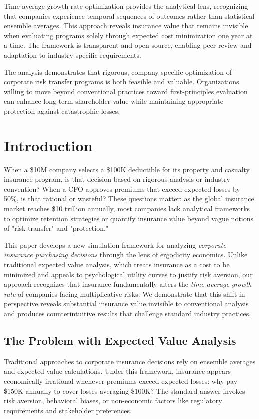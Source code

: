 \documentclass[11pt,letterpaper]{article}
\begin{document}
Time-average growth rate optimization provides the analytical lens, recognizing that companies experience temporal sequences of outcomes rather than statistical ensemble averages. This approach reveals insurance value that remains invisible when evaluating programs solely through expected cost minimization one year at a time. The framework is transparent and open-source, enabling peer review and adaptation to industry-specific requirements.

The analysis demonstrates that rigorous, company-specific optimization of corporate risk transfer programs is both feasible and valuable. Organizations willing to move beyond conventional practices toward first-principles evaluation can enhance long-term shareholder value while maintaining appropriate protection against catastrophic losses.

\section{Introduction}

When a \$10M company selects a \$100K deductible for its property and casualty insurance program, is that decision based on rigorous analysis or industry convention? When a CFO approves premiums that exceed expected losses by 50\%, is that rational or wasteful? These questions matter: as the global insurance market reaches \$10 trillion annually, most companies lack analytical frameworks to optimize retention strategies or quantify insurance value beyond vague notions of "risk transfer" and "protection."

This paper develops a new simulation framework for analyzing \emph{corporate insurance purchasing decisions} through the lens of ergodicity economics. Unlike traditional expected value analysis, which treats insurance as a cost to be minimized and appeals to psychological utility curves to justify risk aversion, our approach recognizes that insurance fundamentally alters the \emph{time-average growth rate} of companies facing multiplicative risks. We demonstrate that this shift in perspective reveals substantial insurance value invisible to conventional analysis and produces counterintuitive results that challenge standard industry practices.

\subsection{The Problem with Expected Value Analysis}

Traditional approaches to corporate insurance decisions rely on ensemble averages and expected value calculations. Under this framework, insurance appears economically irrational whenever premiums exceed expected losses: why pay \$150K annually to cover losses averaging \$100K? The standard answer invokes risk aversion, behavioral biases, or non-economic factors like regulatory requirements and stakeholder preferences.
\end{document}
